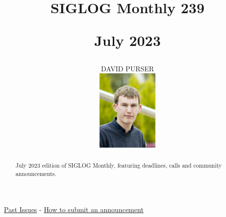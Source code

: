 \documentclass[prodmode,acmtecs]{acmsmall} %
\newcounter{colstart}
\begin{document}
\setcounter{colstart}{\thepage}

\title{{\huge\sc SIGLOG Monthly 239}

 July 2023}
\author{DAVID PURSER
\vspace*{-2.6cm}\begin{flushright}\includegraphics[width=30mm]{dp}\end{flushright}
}

\begin{abstract}
July 2023 edition of SIGLOG Monthly, featuring deadlines, calls and community announcements.
\end{abstract}


\maketitlee

\href{https://lics.siglog.org/newsletters/}{Past Issues}
 - 
\href{https://lics.siglog.org/newsletters/inst.html}{How to submit an announcement}
\end{document}
